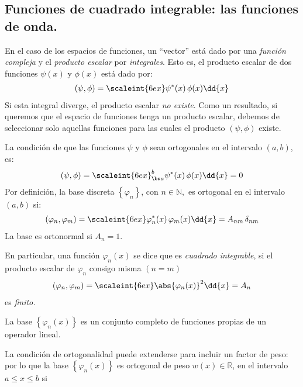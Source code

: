 \subsection{Funciones de cuadrado integrable: las funciones de onda.}

En el caso de los espacios de funciones, un \enquote{vector} está dado por una \emph{función compleja} y el \emph{producto escalar} por \emph{integrales}. Esto es, el producto escalar de dos funciones $\psi (x)$ y $\phi (x)$ está dado por:
\begin{align}
(\psi, \phi) = \scaleint{6ex} \psi^{*} (x) \, \phi (x) \dd{x}
\label{eq:ecuacion_02_21}
\end{align}
Si esta integral diverge, el producto escalar \emph{no existe}. Como un resultado, si queremos que el espacio de funciones tenga un producto escalar, debemos de seleccionar solo aquellas funciones para las cuales el producto $(\psi, \phi)$ existe.
\par
La condición de que las funciones $\psi$ y $\phi$ sean ortogonales en el intervalo $(a, b)$, es:
\begin{align*}
(\psi, \phi) = \scaleint{6ex}_{\bs a}^{b} \psi^{*} (x) \, \phi (x) \dd{x} = 0
\end{align*}
Por definición, la base discreta $\left\{ \varphi_{n} \right\}$, con $n \in \mathbb{N},$ es ortogonal en el intervalo $(a, b)$ si:
\begin{align}
(\varphi_{n}, \varphi_{m}) = \scaleint{6ex} \varphi_{n}^{*} (x) \, \varphi_{m} (x) \dd{x} = A_{nm} \, \delta_{nm}
\label{eq:ecuacion_05_02}
\end{align}
La base es ortonormal si  $A_{n} = 1$.
\par
En particular, una función $\varphi_{n} (x)$ se dice que es \emph{cuadrado integrable}, si el producto escalar de $\varphi_{n}$ consigo misma $(n = m)$
\begin{align}
(\varphi_{n}, \varphi_{m}) = \scaleint{6ex} \abs{\varphi_{n} (x)}^{2} \dd{x} =  A_{n}
\label{eq:ecuacion_02_22}
\end{align}
es \emph{finito.}
\par
La base $\left\{ \varphi_{n} (x) \right\}$ es un conjunto completo de funciones propias de un operador lineal.
\par
La condición de ortogonalidad puede extenderse para incluir un factor de peso: por lo que la base $\left\{ \varphi_{n} (x) \right\}$ es ortogonal de peso $w(x) \in \mathbb{R}$, en el intervalo $a \leq x \leq b$ si
